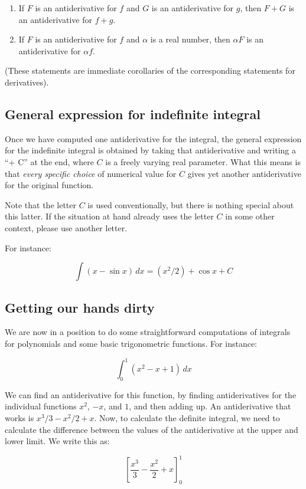 \documentclass[10pt]{amsart}
\begin{document}
\begin{enumerate}
\item If $F$ is an antiderivative for $f$ and $G$ is an antiderivative
  for $g$, then $F + G$ is an antiderivative for $f + g$.
\item If $F$ is an antiderivative for $f$ and $\alpha$ is a real
  number, then $\alpha F$ is an antiderivative for $\alpha f$.
\end{enumerate}

(These statements are immediate corollaries of the corresponding
statements for derivatives).

\subsection{General expression for indefinite integral}

Once we have computed one antiderivative for the integral, the general
expression for the indefinite integral is obtained by taking that
antiderivative and writing a ``+ C'' at the end, where $C$ is a freely
varying real parameter. What this means is that {\em every specific
choice} of numerical value for $C$ gives yet another antiderivative
for the original function.

Note that the letter $C$ is used conventionally, but there is nothing
special about this latter. If the situation at hand already uses the
letter $C$ in some other context, please use another letter.

For instance:

$$\int (x - \sin x) \, dx = (x^2/2) + \cos x + C$$

\subsection{Getting our hands dirty}

We are now in a position to do some straightforward computations of
integrals for polynomials and some basic trigonometric functions. For
instance:

$$\int_0^1 (x^2 - x + 1) \, dx$$

We can find an antiderivative for this function, by finding
antiderivatives for the individual functions $x^2$, $-x$, and $1$, and
then adding up. An antiderivative that works is $x^3/3 - x^2/2 +
x$. Now, to calculate the definite integral, we need to calculate the
difference between the values of the antiderivative at the upper and
lower limit. We write this as:

$$\left[ \frac{x^3}{3} - \frac{x^2}{2} + x \right]_0^1$$
\end{document}
